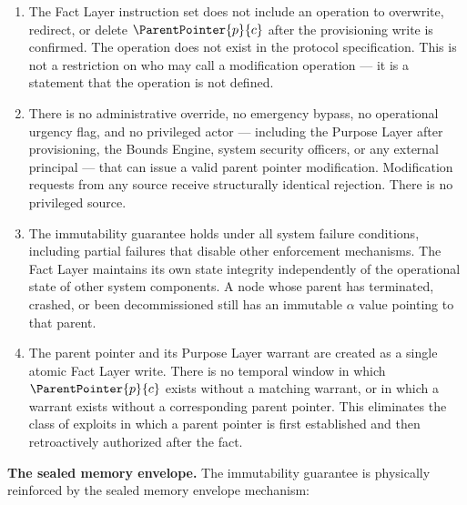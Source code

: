 \begin{enumerate}
    \item[(I1) \textbf{No defined modification operation}] The Fact Layer instruction set does not include an operation to overwrite, redirect, or delete $\ParentPointer{p}{c}$ after the provisioning write is confirmed. The operation does not exist in the protocol specification. This is not a restriction on who may call a modification operation — it is a statement that the operation is not defined.

    \item[(I2) \textbf{No override path for any actor}] There is no administrative override, no emergency bypass, no operational urgency flag, and no privileged actor — including the Purpose Layer after provisioning, the Bounds Engine, system security officers, or any external principal — that can issue a valid parent pointer modification. Modification requests from any source receive structurally identical rejection. There is no privileged source.

    \item[(I3) \textbf{Failure-state resilience}] The immutability guarantee holds under all system failure conditions, including partial failures that disable other enforcement mechanisms. The Fact Layer maintains its own state integrity independently of the operational state of other system components. A node whose parent has terminated, crashed, or been decommissioned still has an immutable $\alpha$ value pointing to that parent.

    \item[(I4) \textbf{Atomic warrant-pointer provisioning}] The parent pointer and its Purpose Layer warrant are created as a single atomic Fact Layer write. There is no temporal window in which $\ParentPointer{p}{c}$ exists without a matching warrant, or in which a warrant exists without a corresponding parent pointer. This eliminates the class of exploits in which a parent pointer is first established and then retroactively authorized after the fact.
\end{enumerate}

\medskip
\noindent\textbf{The sealed memory envelope.} The immutability guarantee is physically reinforced by the sealed memory envelope mechanism:

